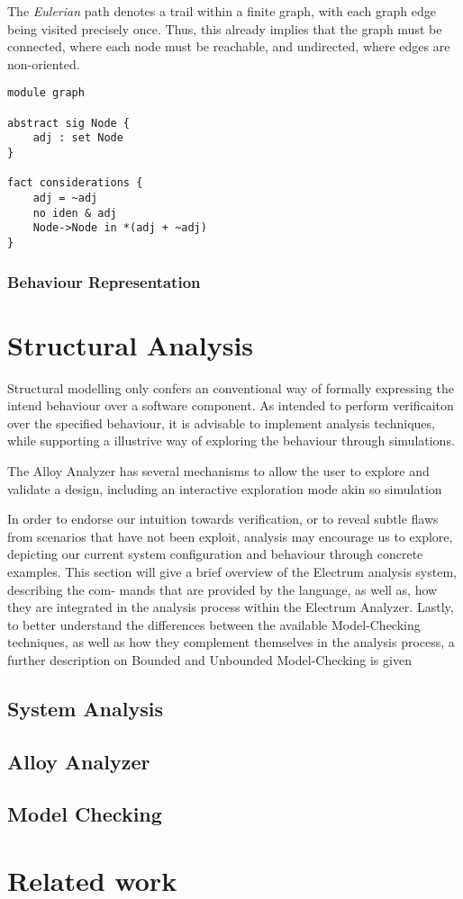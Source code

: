 The \textit{Eulerian} path denotes a trail within a finite graph, with each graph edge being visited precisely once. Thus, this already implies that the graph must be connected, where each node must be reachable, and undirected, where edges are non-oriented. 

\begin{lstlisting}[title={Graph definition.}, otherkeywords = {abstract, sig, module, set, fact, iden, no, in}]
module graph

abstract sig Node {
    adj : set Node
}

fact considerations {
    adj = ~adj
    no iden & adj
    Node->Node in *(adj + ~adj)
}
\end{lstlisting}

\subsubsection{Behaviour Representation}

\section{Structural Analysis}

Structural modelling only confers an conventional way of formally expressing the intend behaviour over a software component. As intended to perform verificaiton over the specified behaviour, it is advisable to implement analysis techniques, while supporting a illustrive way of exploring the behaviour through simulations.

 The Alloy Analyzer has several mechanisms to allow the user to explore and validate a design, including an interactive exploration mode akin so simulation

In order to endorse our intuition towards verification, or to reveal subtle flaws from scenarios that have not been exploit, analysis may encourage us to explore, depicting our current system configuration and behaviour through concrete examples. This section will give a brief overview of the Electrum analysis system, describing the com- mands that are provided by the language, as well as, how they are integrated in the analysis process within the Electrum Analyzer. Lastly, to better understand the differences between the available Model-Checking techniques, as well as how they complement themselves in the analysis process, a further description on Bounded and Unbounded Model-Checking is given

\subsection{System Analysis}

\subsection{Alloy Analyzer}

\subsection{Model Checking}

\section{Related work}\label{s:alloy-relWork}
